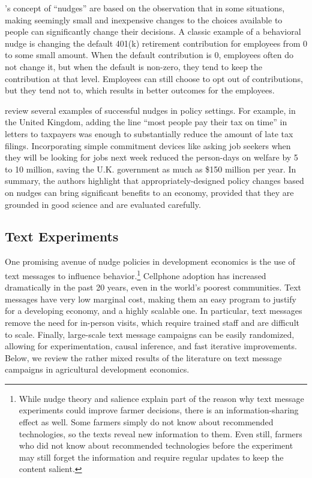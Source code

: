 \documentclass[12pt]{article}
\begin{document}
\textcite{thaler_nudge_2009}'s concept of ``nudges'' are based on the observation that in some situations, making seemingly small and inexpensive changes to the choices available to people can significantly change their decisions. A classic example of a behavioral nudge is changing the default 401(k) retirement contribution for employees from 0 to some small amount. When the default contribution is 0, employees often do not change it, but when the default is non-zero, they tend to keep the contribution at that level. Employees can still choose to opt out of contributions, but they tend not to, which results in better outcomes for the employees.

\textcite{halpern_nudging_2016} review several examples of successful nudges in policy settings. For example, in the United Kingdom, adding the line ``most people pay their tax on time'' in letters to taxpayers was enough to substantially reduce the amount of late tax filings. Incorporating simple commitment devices like asking job seekers when they will be looking for jobs next week reduced the person-days on welfare by 5 to 10 million, saving the U.K. government as much as \$150 million per year. In summary, the authors highlight that appropriately-designed policy changes based on nudges can bring significant benefits to an economy, provided that they are grounded in good science and are evaluated carefully.

\subsection{Text Experiments}
One promising avenue of nudge policies in development economics is the use of text messages to influence behavior.\footnote{While nudge theory and salience explain part of the reason why text message experiments could improve farmer decisions, there is an information-sharing effect as well. Some farmers simply do not know about recommended technologies, so the texts reveal new information to them. Even still, farmers who did not know about recommended technologies before the experiment may still forget the information and require regular updates to keep the content salient.} Cellphone adoption has increased dramatically in the past 20 years, even in the world's poorest communities. Text messages have very low marginal cost, making them an easy program to justify for a developing economy, and a highly scalable one. In particular, text messages remove the need for in-person visits, which require trained staff and are difficult to scale. Finally, large-scale text message campaigns can be easily randomized, allowing for experimentation, causal inference, and fast iterative improvements. Below, we review the rather mixed results of the literature on text message campaigns in agricultural development economics.
\end{document}
